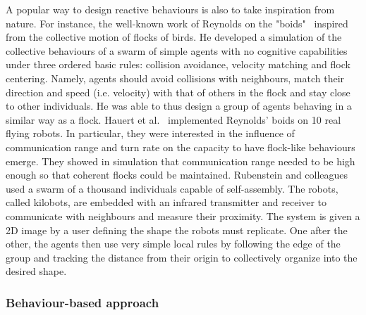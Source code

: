       A popular way to design reactive behaviours is also to take inspiration from nature. For instance, the well-known work of Reynolds on the "boids"~\parencite{Reynolds1987} inspired from the collective motion of flocks of birds. He developed a simulation of the collective behaviours of a swarm of simple agents with no cognitive capabilities under three ordered basic rules: collision avoidance, velocity matching and flock centering. Namely, agents should avoid collisions with neighbours, match their direction and speed (i.e. velocity) with that of others in the flock and stay close to other individuals. He was able to thus design a group of agents behaving in a similar way as a flock. Hauert et al.~\parencite{Hauert2011} implemented Reynolds' boids on 10 real flying robots. In particular, they were interested in the influence of communication range and turn rate on the capacity to have flock-like behaviours emerge. They showed in simulation that communication range needed to be high enough so that coherent flocks could be maintained. Rubenstein and colleagues~\parencite{Rubenstein2014} used a swarm of a thousand individuals capable of self-assembly. The robots, called kilobots, are embedded with an infrared transmitter and receiver to communicate with neighbours and measure their proximity. The system is given a 2D image by a user defining the shape the robots must replicate. One after the other, the agents then use very simple local rules by following the edge of the group and tracking the distance from their origin to collectively organize into the desired shape.



    \subsubsection{Behaviour-based approach}

